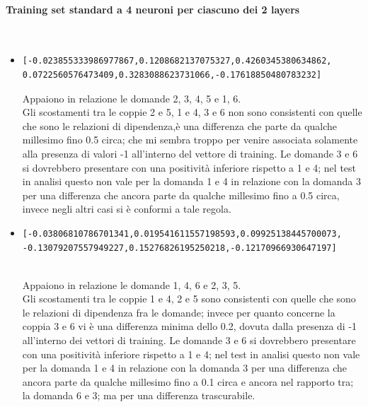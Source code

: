 \paragraph{Training set standard a 4 neuroni per ciascuno dei 2 layers}\mbox{}
\label{Training set standard a 4 neuroni per ciascuno dei 2 layers}
\\
\noindent
\begin{itemize}
\item \begin{verbatim}[-0.023855333986977867,0.1208682137075327,0.4260345380634862,
0.0722560576473409,0.3283088623731066,-0.17618850480783232] \end{verbatim}
Appaiono in relazione le domande 2, 3, 4, 5 e 1, 6.\\
Gli scostamenti tra le coppie 2 e 5, 1 e 4, 3 e 6 non sono consistenti con quelle che sono le relazioni di dipendenza,\`e una differenza che parte da qualche millesimo fino 0.5 circa; che mi sembra troppo per venire associata solamente alla presenza di valori -1 all'interno del vettore di training.
Le domande 3 e 6 si dovrebbero presentare con una positivit\`a inferiore rispetto a 1 e 4; nel test in analisi questo non vale per la domanda 1 e 4 in relazione con la domanda 3 per una differenza che ancora parte da qualche millesimo fino a 0.5 circa, invece negli altri casi si \`e conformi a tale regola.

\item \begin{verbatim}[-0.03806810786701341,0.019541611557198593,0.09925138445700073,
-0.13079207557949227,0.15276826195250218,-0.12170966930647197] \end{verbatim}\\
Appaiono in relazione le domande 1, 4, 6 e 2, 3, 5.\\
Gli scostamenti tra le coppie 1 e 4, 2 e 5 sono consistenti con quelle che sono le relazioni di dipendenza fra le domande; invece per quanto concerne la coppia 3 e 6 vi \`e una differenza minima dello 0.2, dovuta dalla presenza di -1  all'interno dei vettori di training.
Le domande 3 e 6 si dovrebbero presentare con una positivit\`a inferiore rispetto a 1 e 4; nel test in analisi questo non vale per la domanda 1 e 4 in relazione con la domanda 3 per una differenza che ancora parte da qualche millesimo fino a 0.1 circa e ancora nel rapporto tra; la domanda 6 e 3; ma per una differenza trascurabile.


\end{itemize}
